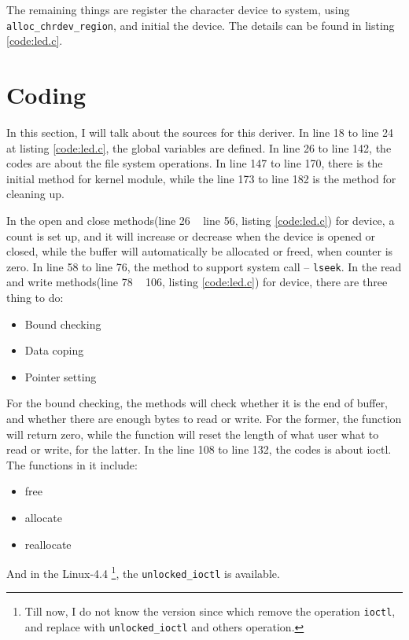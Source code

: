 \documentclass{report}
\begin{document}
    The remaining things are register the character device to system, using
    \lstinline|alloc_chrdev_region|, and initial the device. The details can be found in listing \ref{code:led.c}.
    
    \section{Coding}
    \label{chap:scd:coding}
    
    In this section, I will talk about the sources for this deriver.
    In line 18 to line 24 at listing \ref{code:led.c}, the global variables are defined.
    In line 26 to line 142, the codes are about the file system operations.
    In line 147 to line 170, there is the initial method for kernel module, while
    the line 173 to line 182 is the method for cleaning up.
    
    In the open and close methods(line 26 ~ line 56, listing \ref{code:led.c}) for device,
    a count is set up, and it will increase or decrease when the device is opened or closed,
    while the buffer will automatically be allocated or freed, when counter is zero.
    In line 58 to line 76, the method to support system call -- \lstinline|lseek|.
    In the read and write methods(line 78 ~ 106, listing \ref{code:led.c}) for device,
    there are three thing to do:
    \begin{itemize}
        \item Bound checking
        \item Data coping
        \item Pointer setting
    \end{itemize}
    For the bound checking, the methods will check whether it is the end of buffer, and whether there are enough bytes to read or write. For the former, the function will return zero,
    while the function will reset the length of what user what to read or write, for the latter.
    In the line 108 to line 132, the codes is about ioctl. The functions in it include:
    \begin{itemize}
        \item free
        \item allocate
        \item reallocate
    \end{itemize}
    
    And in the Linux-4.4%
    \footnote{Till now, I do not know the version since which remove the operation \lstinline|ioctl|, and replace with \lstinline|unlocked_ioctl| and others operation.},
    the \lstinline|unlocked_ioctl| is available.
    
\end{document}
